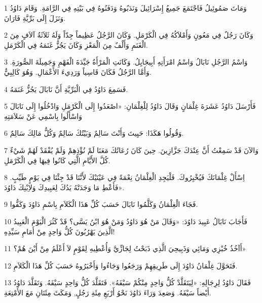 \par 1 وَمَاتَ صَمُوئِيلُ فَاجْتَمَعَ جَمِيعُ إِسْرَائِيلَ وَنَدَبُوهُ وَدَفَنُوهُ فِي بَيْتِهِ فِي الرَّامَةِ. وَقَامَ دَاوُدُ وَنَزَلَ إِلَى بَرِّيَّةِ فَارَانَ.
\par 2 وَكَانَ رَجُلٌ فِي مَعُونٍ وَأَمْلاَكُهُ فِي الْكَرْمَلِ. وَكَانَ الرَّجُلُ عَظِيماً جِدّاً وَلَهُ ثَلاَثَةُ آلاَفٍ مِنَ الْغَنَمِ وَأَلْفٌ مِنَ الْمَعْزِ وَكَانَ يَجُزُّ غَنَمَهُ فِي الْكَرْمَلِ.
\par 3 وَاسْمُ الرَّجُلِ نَابَالُ وَاسْمُ امْرَأَتِهِ أَبِيجَايِلُ. وَكَانَتِ الْمَرْأَةُ جَيِّدَةَ الْفَهْمِ وَجَمِيلَةَ الصُّورَةِ. وَأَمَّا الرَّجُلُ فَكَانَ قَاسِياً وَرَدِيءَ الأَعْمَالِ. وَهُوَ كَالِبِيٌّ.
\par 4 فَسَمِعَ دَاوُدُ فِي الْبَرِّيَّةِ أَنَّ نَابَالَ يَجُزُّ غَنَمَهُ.
\par 5 فَأَرْسَلَ دَاوُدُ عَشَرَةَ غِلْمَانٍ وَقَالَ دَاوُدُ لِلْغِلْمَانِ: «اصْعَدُوا إِلَى الْكَرْمَلِ وَادْخُلُوا إِلَى نَابَالَ وَاسْأَلُوا بِاسْمِي عَنْ سَلاَمَتِهِ
\par 6 وَقُولُوا هَكَذَا: حَيِيتَ وَأَنْتَ سَالِمٌ وَبَيْتُكَ سَالِمٌ وَكُلُّ مَالِكَ سَالِمٌ.
\par 7 وَالآنَ قَدْ سَمِعْتُ أَنَّ عِنْدَكَ جَزَّازِينَ. حِينَ كَانَ رُعَاتُكَ مَعَنَا لَمْ نُؤْذِهِمْ وَلَمْ يُفْقَدْ لَهُمْ شَيْءٌ كُلَّ الأَيَّامِ الَّتِي كَانُوا فِيهَا فِي الْكَرْمَلِ.
\par 8 اِسْأَلْ غِلْمَانَكَ فَيُخْبِرُوكَ. فَلْيَجِدِ الْغِلْمَانُ نِعْمَةً فِي عَيْنَيْكَ لأَنَّنَا قَدْ جِئْنَا فِي يَوْمٍ طَيِّبٍ. فَأَعْطِ مَا وَجَدَتْهُ يَدُكَ لِعَبِيدِكَ وَلاِبْنِكَ دَاوُدَ».
\par 9 فَجَاءَ الْغِلْمَانُ وَكَلَّمُوا نَابَالَ حَسَبَ كُلِّ هَذَا الْكَلاَمِ بِاسْمِ دَاوُدَ وَكَفُّوا.
\par 10 فَأَجَابَ نَابَالُ عَبِيدَ دَاوُدَ: «وَقَالَ مَنْ هُوَ دَاوُدُ وَمَنْ هُوَ ابْنُ يَسَّى؟ قَدْ كَثُرَ الْيَوْمَ الْعَبِيدُ الَّذِينَ يَهْرُبُونَ كُلُّ وَاحِدٍ مِنْ أَمَامِ سَيِّدِهِ!
\par 11 أَآخُذُ خُبْزِي وَمَائِي وَذَبِيحِيَ الَّذِي ذَبَحْتُ لِجَازِّيَّ وَأُعْطِيهِ لِقَوْمٍ لاَ أَعْلَمُ مِنْ أَيْنَ هُمْ؟»
\par 12 فَتَحَوَّلَ غِلْمَانُ دَاوُدَ إِلَى طَرِيقِهِمْ وَرَجَعُوا وَجَاءُوا وَأَخْبَرُوهُ حَسَبَ كُلِّ هَذَا الْكَلاَمِ.
\par 13 فَقَالَ دَاوُدُ لِرِجَالِهِ: «لِيَتَقَلَّدْ كُلُّ وَاحِدٍ مِنْكُمْ سَيْفَهُ». فَتَقَلَّدَ كُلُّ وَاحِدٍ سَيْفَهُ. وَتَقَلَّدَ دَاوُدُ أَيْضاً سَيْفَهُ. وَصَعِدَ وَرَاءَ دَاوُدَ نَحْوُ أَرْبَعِ مِئَةِ رَجُلٍ, وَمَكَثَ مِئَتَانِ مَعَ الأَمْتِعَةِ.
